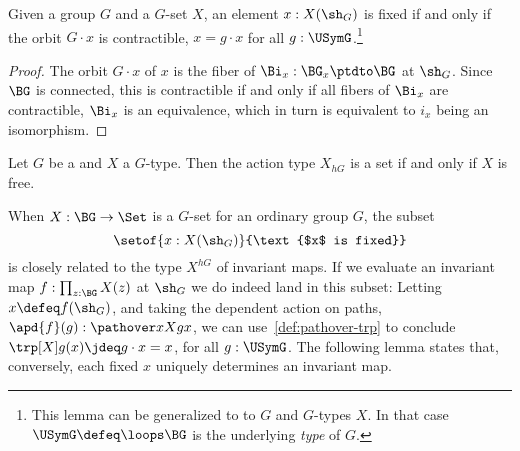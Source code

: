 \begin{lemma}\label{lem:fixed-char}
  Given a group $G$ and a $G$-set $X$, an element $x:X(\sh_G)$ is
 fixed if and only if the orbit $G\cdot x$ is contractible,
  \ie $x = g\cdot x$ for all $g:\USymG$.\footnote{%
  This lemma can be generalized to to \inftygps $G$ and $G$-types $X$.
  In that case $\USymG\defeq\loops\BG$ is the underlying \emph{type} of $G$.}
\end{lemma}
\begin{proof}
  The orbit $G\cdot x$ of $x$ is the fiber of $\Bi_x : \BG_x \ptdto \BG$
  at $\sh_G$. Since $\BG$ is connected,
  this is contractible if and only if all fibers of $\Bi_x$ are contractible,
  \ie $\Bi_x$ is an equivalence, which in turn is equivalent to $i_x$
  being an isomorphism.
\end{proof}

\begin{xca}\label{xca:X_hG-set-iff-Xfree}
Let $G$ be a \aninftygp and $X$ a $G$-type. Then the
action type $X_{hG}$ is a set if and only if $X$ is free.
\end{xca}

When $X : \BG \to \Set$ is a $G$-set for an ordinary group $G$, the subset
\[
  \setof{x : X(\sh_G)}{\text{$x$ is fixed}}
\]
is closely related to the type $X^{hG}$ of invariant maps.
If we evaluate an invariant map $f : \prod_{z:\BG}X(z)$ at $\sh_G$
we do indeed land in this subset:
Letting $x\defeq f(\sh_G)$,
and taking the dependent action on paths,
$\apd{f}(g) : \pathover x X g x$,
we can use~\cref{def:pathover-trp} to conclude
$\trp[X] g(x)\jdeq g\cdot x = x$, for all $g:\USymG$.
The following lemma states that, conversely, each fixed $x$ uniquely
determines an invariant map.

